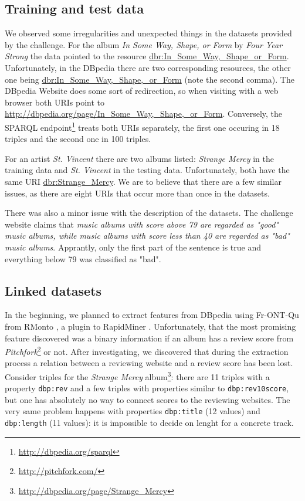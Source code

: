 \documentclass{llncs}
\begin{document}
\subsection{Training and test data}
We observed some irregularities and unexpected things in the datasets provided by the challenge.
For the album \emph{In Some Way, Shape, or Form} by \emph{Four Year Strong} the data pointed to the resource \url{dbr:In_Some_Way,_Shape_or_Form}.
Unfortunately, in the DBpedia there are two corresponding resources, the other one being \url{dbr:In_Some_Way,_Shape,_or_Form} (note the second comma).
The DBpedia Website does some sort of redirection, so when visiting with a web browser both URIs point to \url{http://dbpedia.org/page/In_Some_Way,_Shape,_or_Form}.
Conversely, the SPARQL endpoint\footnote{\url{http://dbpedia.org/sparql}} treats both URIs separately, the first one occuring in 18 triples and the second one in 100 triples.

For an artist \emph{St. Vincent} there are two albums listed: \emph{Strange Mercy} in the training data and \emph{St. Vincent} in the testing data.
Unfortunately, both have the same URI \url{dbr:Strange_Mercy}.
We are to believe that there are a few similar issues, as there are eight URIs that occur more than once in the datasets.

There was also a minor issue with the description of the datasets.
The challenge website claims that \emph{music albums with score above 79 are regarded as "good" music albums, while music albums with score less than 40 are regarded as "bad" music albums}.
Apprantly, only the first part of the sentence is true and everything below 79 was classified as "bad".

\subsection{Linked datasets\label{sec:ld}}
In the beginning, we planned to extract features from DBpedia using Fr-ONT-Qu \cite{frontqu} from RMonto \cite{rmonto}, a plugin to RapidMiner \cite{rapidminer}.
Unfortunately, that the most promising feature discovered was a binary information if an album has a review score from \emph{Pitchfork}\footnote{\url{http://pitchfork.com/}} or not.
After investigating, we discovered that during the extraction process a relation between a reviewing website and a review score has been lost.
Consider triples for the \emph{Strange Mercy} album\footnote{\url{http://dbpedia.org/page/Strange_Mercy}}: there are 11 triples with a property \texttt{dbp:rev} and a few triples with properties similar to \texttt{dbp:rev10score}, but one has absolutely no way to connect scores to the reviewing websites.
The very same problem happens with properties \texttt{dbp:title} (12 values) and \texttt{dbp:length} (11 values): it is impossible to decide on lenght for a concrete track.
\end{document}
